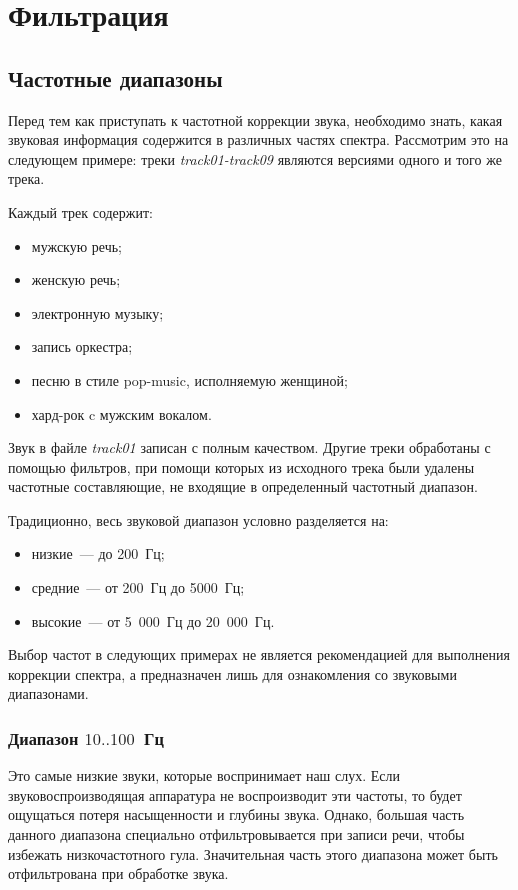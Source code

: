 \documentclass[oneside, final, 14pt]{extreport}
\begin{document}
\setcounter{chapter}{5}
\chapter{Фильтрация}
\section{Частотные диапазоны}
Перед тем как приступать к частотной коррекции звука, необходимо знать, какая звуковая информация содержится в различных частях спектра. Рассмотрим это на следующем примере: треки \emph{track01-track09} являются версиями одного и того же трека.

Каждый трек содержит:
\begin{itemize}
\item мужскую речь;
\item женскую речь;
\item электронную музыку;
\item запись оркестра;
\item песню в стиле pop-music, исполняемую женщиной;
\item хард-рок c мужским вокалом.
\end{itemize}

Звук в файле  \emph{track01} записан с полным качеством. Другие треки обработаны с помощью фильтров, при помощи которых из исходного трека были удалены частотные составляющие, не входящие в определенный частотный диапазон.

Традиционно, весь звуковой диапазон условно разделяется на:
\begin{itemize}
\item низкие~--- до 200~Гц;
\item средние~--- от 200~Гц до 5000~Гц;
\item высокие~--- от 5~000~Гц до 20~000~Гц.
\end{itemize}

Выбор частот в следующих примерах не является рекомендацией для выполнения коррекции спектра, а предназначен лишь для ознакомления со звуковыми диапазонами.

\subsection{Диапазон $10..100$~Гц}
Это самые низкие звуки, которые воспринимает наш слух. Если звуковоспроизводящая аппаратура не воспроизводит эти частоты, то будет ощущаться потеря насыщенности и глубины звука. Однако, большая часть данного диапазона специально отфильтровывается при записи речи, чтобы избежать низкочастотного гула. Значительная часть этого диапазона может быть отфильтрована при обработке звука.
\end{document}

